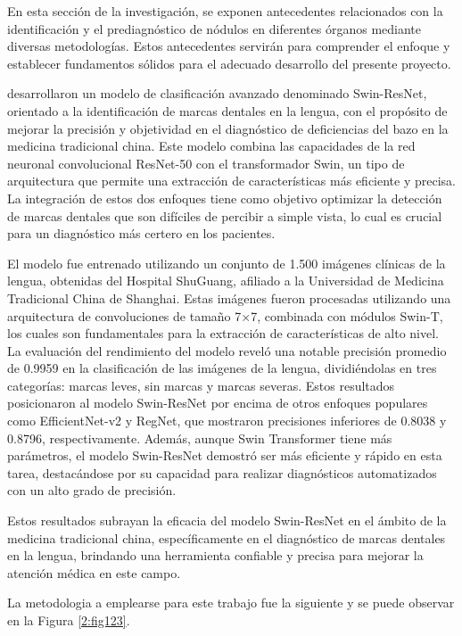 En esta sección de la investigación, se exponen antecedentes relacionados con la identificación y el prediagnóstico de nódulos en diferentes órganos mediante diversas metodologías. Estos antecedentes servirán para comprender el enfoque y establecer fundamentos sólidos para el adecuado desarrollo del presente proyecto.

\cite{Zhao2024} desarrollaron un modelo de clasificación avanzado denominado Swin-ResNet, orientado a la identificación de marcas dentales en la lengua, con el propósito de mejorar la precisión y objetividad en el diagnóstico de deficiencias del bazo en la medicina tradicional china. Este modelo combina las capacidades de la red neuronal convolucional ResNet-50 con el transformador Swin, un tipo de arquitectura que permite una extracción de características más eficiente y precisa. La integración de estos dos enfoques tiene como objetivo optimizar la detección de marcas dentales que son difíciles de percibir a simple vista, lo cual es crucial para un diagnóstico más certero en los pacientes.

El modelo fue entrenado utilizando un conjunto de 1.500 imágenes clínicas de la lengua, obtenidas del Hospital ShuGuang, afiliado a la Universidad de Medicina Tradicional China de Shanghai. Estas imágenes fueron procesadas utilizando una arquitectura de convoluciones de tamaño 7×7, combinada con módulos Swin-T, los cuales son fundamentales para la extracción de características de alto nivel. La evaluación del rendimiento del modelo reveló una notable precisión promedio de 0.9959 en la clasificación de las imágenes de la lengua, dividiéndolas en tres categorías: marcas leves, sin marcas y marcas severas. Estos resultados posicionaron al modelo Swin-ResNet por encima de otros enfoques populares como EfficientNet-v2 y RegNet, que mostraron precisiones inferiores de 0.8038 y 0.8796, respectivamente. Además, aunque Swin Transformer tiene más parámetros, el modelo Swin-ResNet demostró ser más eficiente y rápido en esta tarea, destacándose por su capacidad para realizar diagnósticos automatizados con un alto grado de precisión.

Estos resultados subrayan la eficacia del modelo Swin-ResNet en el ámbito de la medicina tradicional china, específicamente en el diagnóstico de marcas dentales en la lengua, brindando una herramienta confiable y precisa para mejorar la atención médica en este campo.

La metodologia a emplearse para este trabajo fue la siguiente y se puede observar en la Figura \ref{2:fig123}.


